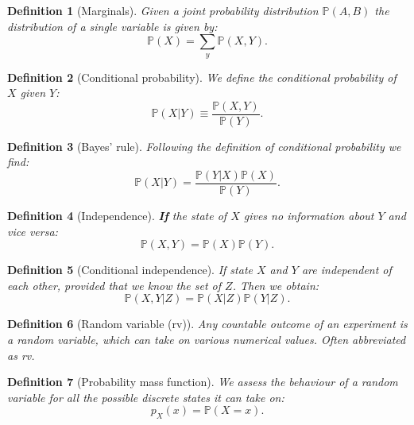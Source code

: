 \documentclass{article}
\newtheorem{definition}{Definition}
\begin{document}
\begin{definition}[Marginals] Given a \textit{joint probability distribution} $\mathbb{P}(A,B)$ the distribution of a single variable is given by:
\begin{equation}
    \mathbb{P}(X)=\sum_y \mathbb{P}(X,Y).
\end{equation}
\end{definition}
\begin{definition}[Conditional probability]
    We define the conditional probability of $X$ given $Y$:
    \begin{equation}
        \mathbb{P}(X|Y)\equiv \frac{\mathbb{P}(X,Y)}{\mathbb{P}(Y)}.
    \end{equation}
\end{definition}
\begin{definition}[Bayes' rule]
    Following the definition of conditional probability we find:
    \begin{equation}
        \mathbb{P}(X|Y)=\frac{\mathbb{P}(Y|X)\mathbb{P}(X)}{\mathbb{P}(Y)}.
    \end{equation}
\end{definition}
\begin{definition}[Independence]
    \textbf{If} the state of $X$ gives no information about $Y$ and vice versa:
    \begin{equation}
        \mathbb{P}(X,Y)=\mathbb{P}(X)\mathbb{P}(Y).
    \end{equation}
\end{definition}
\begin{definition}[Conditional independence]
    If state $X$ and $Y$ are independent of each other, \emph{provided} that we know the set of $Z$. Then we obtain:
    \begin{equation}
        \mathbb{P}(X,Y|Z) = \mathbb{P}(X|Z)\mathbb{P}(Y|Z).
    \end{equation}
\end{definition}
\begin{definition}[Random variable (rv)]
    Any countable outcome of an experiment is a random variable, which can take on various numerical values. Often abbreviated as rv.
\end{definition}
\begin{definition}[Probability mass function]
    We assess the behaviour of a random variable for all the possible discrete states it can take on:
    \begin{equation}
        p_X(x) = \mathbb{P}(X=x).
    \end{equation}
\end{definition}
\end{document}
